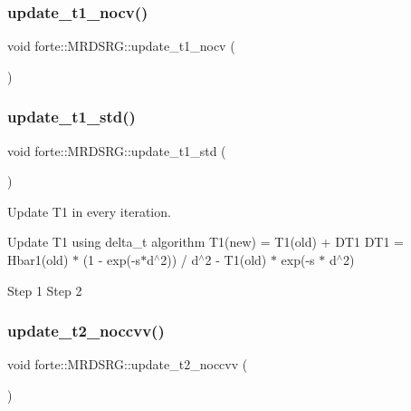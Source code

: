 \subsubsection{\texorpdfstring{update\+\_\+t1\+\_\+nocv()}{update\_t1\_nocv()}}
{\footnotesize\ttfamily void forte\+::\+M\+R\+D\+S\+R\+G\+::update\+\_\+t1\+\_\+nocv (\begin{DoxyParamCaption}{ }\end{DoxyParamCaption})\hspace{0.3cm}{\ttfamily [protected]}}

\mbox{\label{classforte_1_1_m_r_d_s_r_g_af0406f2614ef646d92ae035206cff545}} 
\subsubsection{\texorpdfstring{update\+\_\+t1\+\_\+std()}{update\_t1\_std()}}
{\footnotesize\ttfamily void forte\+::\+M\+R\+D\+S\+R\+G\+::update\+\_\+t1\+\_\+std (\begin{DoxyParamCaption}{ }\end{DoxyParamCaption})\hspace{0.3cm}{\ttfamily [protected]}}



Update T1 in every iteration. 

Update T1 using delta\+\_\+t algorithm T1(new) = T1(old) + D\+T1 D\+T1 = Hbar1(old) $\ast$ (1 -\/ exp(-\/s$\ast$d$^\wedge$2)) / d$^\wedge$2 -\/ T1(old) $\ast$ exp(-\/s $\ast$ d$^\wedge$2) 

 Step 1 Step 2\mbox{\label{classforte_1_1_m_r_d_s_r_g_a7a33ae32385ecd61769a1dfb0d315d55}} 
\subsubsection{\texorpdfstring{update\+\_\+t2\+\_\+noccvv()}{update\_t2\_noccvv()}}
{\footnotesize\ttfamily void forte\+::\+M\+R\+D\+S\+R\+G\+::update\+\_\+t2\+\_\+noccvv (\begin{DoxyParamCaption}{ }\end{DoxyParamCaption})\hspace{0.3cm}{\ttfamily [protected]}}

